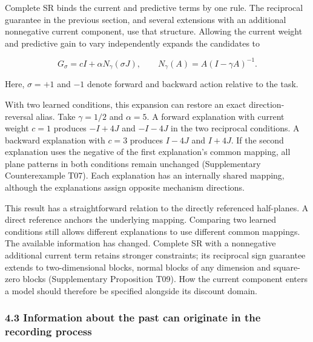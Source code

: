 \documentclass[11pt,a4paper]{article}
\begin{document}
\par
\noindent\begin{minipage}{\linewidth}

Complete SR binds the current and predictive terms by one rule. The
reciprocal guarantee in the previous section, and several extensions
with an additional nonnegative current component, use that structure.
Allowing the current weight and predictive gain to vary independently
expands the candidates to

\[
G_\sigma=cI+\alpha N_\gamma(\sigma J),
\qquad N_\gamma(A)=A(I-\gamma A)^{-1}.
\]

\end{minipage}\par

Here, \(\sigma=+1\) and \(-1\) denote forward and backward action
relative to the task.

With two learned conditions, this expansion can restore an exact
direction-reversal alias. Take \(\gamma=1/2\) and \(\alpha=5\). A
forward explanation with current weight \(c=1\) produces \(-I+4J\) and
\(-I-4J\) in the two reciprocal conditions. A backward explanation with
\(c=3\) produces \(I-4J\) and \(I+4J\). If the second explanation uses
the negative of the first explanation's common mapping, all plane
patterns in both conditions remain unchanged (Supplementary
Counterexample T07). Each explanation has an internally shared mapping,
although the explanations assign opposite mechanism directions.

This result has a straightforward relation to the directly referenced
half-planes. A direct reference anchors the underlying mapping.
Comparing two learned conditions still allows different explanations to
use different common mappings. The available information has changed.
Complete SR with a nonnegative additional current term retains stronger
constraints; its reciprocal sign guarantee extends to two-dimensional
blocks, normal blocks of any dimension and square-zero blocks
(Supplementary Proposition T09). How the current component enters a
model should therefore be specified alongside its discount domain.

\subsubsection{4.3 Information about the past can originate in the
recording
process}\label{information-about-the-past-can-originate-in-the-recording-process}
\end{document}
